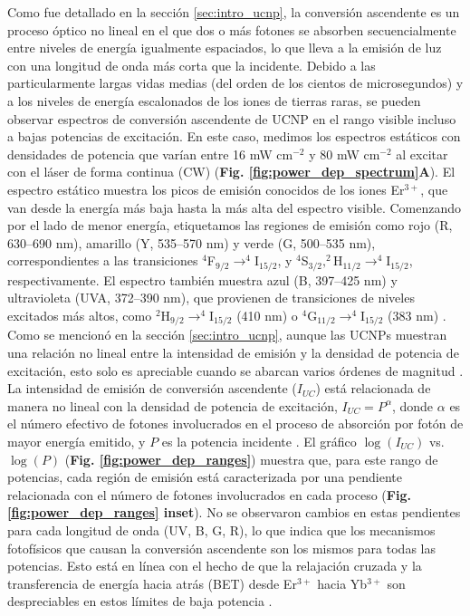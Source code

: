 Como fue detallado en la sección \ref{sec:intro_ucnp}, la conversión ascendente es un proceso óptico no lineal en el que dos o más fotones se absorben secuencialmente entre niveles de energía igualmente espaciados, lo que lleva a la emisión de luz con una longitud de onda más corta que la incidente.  
Debido a las particularmente largas vidas medias (del orden de los cientos de microsegundos) y a los niveles de energía escalonados de los iones de tierras raras, se pueden observar espectros de conversión ascendente de UCNP en el rango visible incluso a bajas potencias de excitación.  
En este caso, medimos los espectros estáticos con densidades de potencia que varían entre 16 mW cm$^{-2}$ y 80 mW cm$^{-2}$ al excitar con el láser de forma continua (CW) (\textbf{Fig. \ref{fig:power_dep_spectrum}A}).  
El espectro estático muestra los picos de emisión conocidos de los iones Er$^{3+}$, que van desde la energía más baja hasta la más alta del espectro visible.  
Comenzando por el lado de menor energía, etiquetamos las regiones de emisión como rojo (R, 630–690 nm), amarillo (Y, 535–570 nm) y verde (G, 500–535 nm), correspondientes a las transiciones $^4$F$_{9/2} \to ^4$I$_{15/2}$, y $^4$S$_{3/2}, ^2$H$_{11/2} \to ^4$I$_{15/2}$, respectivamente.  
El espectro también muestra azul (B, 397–425 nm) y ultravioleta (UVA, 372–390 nm), que provienen de transiciones de niveles excitados más altos, como $^2$H$_{9/2} \to ^4$I$_{15/2}$ (410 nm) o $^4$G$_{11/2} \to ^4$I$_{15/2}$ (383 nm) \cite{haase_upconverting_2011}.  
Como se mencionó en la sección \ref{sec:intro_ucnp}, aunque las UCNPs muestran una relación no lineal entre la intensidad de emisión y la densidad de potencia de excitación, esto solo es apreciable cuando se abarcan varios órdenes de magnitud \cite{pollnau2000}.  
La intensidad de emisión de conversión ascendente ($I_{UC}$) está relacionada de manera no lineal con la densidad de potencia de excitación, $I_{UC} = P^\alpha$, donde $\alpha$ es el número efectivo de fotones involucrados en el proceso de absorción por fotón de mayor energía emitido, y $P$ es la potencia incidente \cite{Auzel2004}.  
El gráfico $\log{(I_{UC})}$ vs. $\log{(P)}$ (\textbf{Fig. \ref{fig:power_dep_ranges}}) muestra que, para este rango de potencias, cada región de emisión está caracterizada por una pendiente relacionada con el número de fotones involucrados en cada proceso (\textbf{Fig. \ref{fig:power_dep_ranges} inset}).  
No se observaron cambios en estas pendientes para cada longitud de onda (UV, B, G, R), lo que indica que los mecanismos fotofísicos que causan la conversión ascendente son los mismos para todas las potencias.  
Esto está en línea con el hecho de que la relajación cruzada y la transferencia de energía hacia atrás (BET) desde Er$^{3+}$ hacia Yb$^{3+}$ son despreciables en estos límites de baja potencia \cite{suyver_anomalous_2005} \cite{berry_disputed_2015}.


